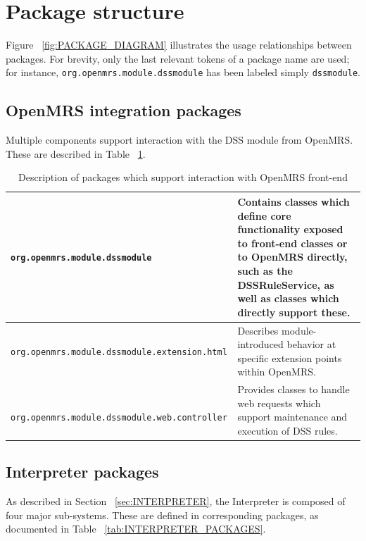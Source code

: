 \documentclass[12pt,letterpaper]{article}
\begin{document}
{%

\newpage 
\section{Package structure}

Figure ~\ref{fig:PACKAGE_DIAGRAM} illustrates the usage relationships 
between packages. For brevity, only the last relevant tokens of a 
package name are used; for instance, 
\texttt{org.openmrs.module.dssmodule} has been labeled simply 
\texttt{dssmodule}.

\subsection{OpenMRS integration packages}

Multiple components support interaction with the DSS module from 
OpenMRS. These are described in Table 
~\ref{tab:INTEGRATION_PACKAGES}.

\begin{table}
\begin{center}
\begin{tabular}{ >{\tt}l | p{2.5in} }
org.openmrs.module.dssmodule &
Contains classes which define core functionality exposed to front-end 
classes or to OpenMRS directly, such as the DSSRuleService, as well 
as classes which directly support these. \\ \hline
org.openmrs.module.dssmodule.extension.html &
Describes module-introduced behavior at specific extension points 
within OpenMRS.
 \\ \hline
org.openmrs.module.dssmodule.web.controller &
Provides classes to handle web requests which support maintenance 
and execution of DSS rules. \\ \hline
\end{tabular}
\end{center}
\caption{Description of packages which support interaction with OpenMRS front-end} 
\label{tab:INTEGRATION_PACKAGES}
\end{table}

\subsection{Interpreter packages}

As described in Section ~\ref{sec:INTERPRETER}, the Interpreter is 
composed of four major sub-systems. These are defined in corresponding 
packages, as documented in Table ~\ref{tab:INTERPRETER_PACKAGES}.

}
\end{document}
